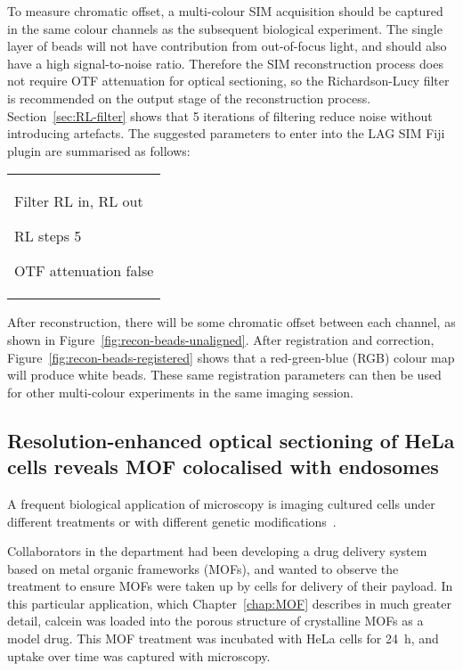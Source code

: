 To measure chromatic offset, a multi-colour SIM acquisition should be captured in the same colour channels as the subsequent biological experiment. 
The single layer of beads will not have contribution from out-of-focus light, and should also have a high signal-to-noise ratio. 
Therefore the SIM reconstruction process does not require OTF attenuation for optical sectioning, so the Richardson-Lucy filter is recommended on the output stage of the reconstruction process. 
Section~\ref{sec:RL-filter} shows that 5 iterations of filtering reduce noise without introducing artefacts.
The suggested parameters to enter into the LAG SIM Fiji plugin are summarised as follows: \newline
\begin{tabular}{p{}}
\begin{labelling}[margin=OTF attenuation]
	\item[Filter] RL in, RL out
	\item[RL steps] 5
	\item[OTF attenuation] false
\end{labelling}
\end{tabular}

After reconstruction, there will be some chromatic offset between each channel, as shown in Figure~\ref{fig:recon-beads-unaligned}. 
After registration and correction, Figure~\ref{fig:recon-beads-registered} shows that a red-green-blue (RGB) colour map will produce white beads. 
These same registration parameters can then be used for other multi-colour experiments in the same imaging session. 


\subsection{Resolution-enhanced optical sectioning of HeLa cells reveals MOF colocalised with endosomes}
A frequent biological application of microscopy is imaging cultured cells under different treatments or with different genetic modifications~\cite{white1987evaluation, specht2017critical, wang2017analysis}.

Collaborators in the department had been developing a drug delivery system based on metal organic frameworks (MOFs), and wanted to observe the treatment to ensure MOFs were taken up by cells for delivery of their payload. 
In this particular application, which Chapter~\ref{chap:MOF} describes in much greater detail, calcein was loaded into the porous structure of crystalline MOFs as a model drug.
This MOF treatment was incubated with HeLa cells for \SI{24}{\hour}, and uptake over time was captured with microscopy.

